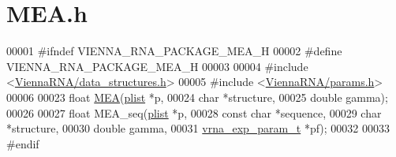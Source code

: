 \hypertarget{MEA_8h_source}{\section{M\+E\+A.\+h}
\label{MEA_8h_source}
}

\begin{DoxyCode}
00001 \textcolor{preprocessor}{#ifndef VIENNA\_RNA\_PACKAGE\_MEA\_H}
00002 \textcolor{preprocessor}{#define VIENNA\_RNA\_PACKAGE\_MEA\_H}
00003 
00004 \textcolor{preprocessor}{#include <\hyperlink{data__structures_8h}{ViennaRNA/data\_structures.h}>}
00005 \textcolor{preprocessor}{#include <\hyperlink{params_8h}{ViennaRNA/params.h}>}
00006 
00023 \textcolor{keywordtype}{float} \hyperlink{MEA_8h_a396ec6144c6a74fcbab4cea6b42d76c3}{MEA}(\hyperlink{group__data__structures_structvrna__plist__s}{plist} *p,
00024           \textcolor{keywordtype}{char} *structure,
00025           \textcolor{keywordtype}{double} gamma);
00026 
00027 \textcolor{keywordtype}{float} MEA\_seq(\hyperlink{group__data__structures_structvrna__plist__s}{plist} *p,
00028               \textcolor{keyword}{const} \textcolor{keywordtype}{char} *sequence,
00029               \textcolor{keywordtype}{char} *structure,
00030               \textcolor{keywordtype}{double} gamma,
00031               \hyperlink{group__energy__parameters_structvrna__exp__param__s}{vrna\_exp\_param\_t} *pf);
00032 
00033 \textcolor{preprocessor}{#endif}
\end{DoxyCode}
